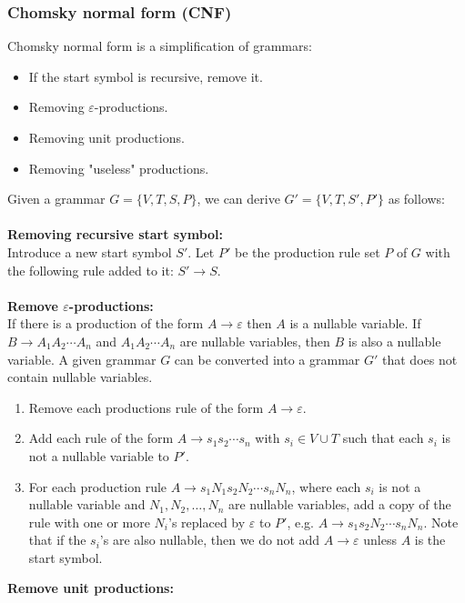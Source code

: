 \documentclass[11pt]{article}
\begin{document}
\subsubsection{Chomsky normal form (CNF)}
Chomsky normal form is a simplification of grammars:
\begin{itemize}
    \item If the start symbol is recursive, remove it.
    \item Removing $\varepsilon$-productions.
    \item Removing unit productions.
    \item Removing "useless" productions.
\end{itemize}
\begin{note_special}
Given a grammar $G=\{V,T,S,P\}$, we can derive $G'=\{V,T,S',P'\}$ as follows:
\\\\
\textbf{Removing recursive start symbol:}\\
Introduce a new start symbol $S'$. Let $P'$ be the production rule set $P$ of $G$ with the following rule added to it: $S'\rightarrow S$. 
\\\\
\textbf{Remove $\varepsilon$-productions:}\\
If there is a production of the form $A\rightarrow\varepsilon$ then $A$ is a nullable variable.
If $B\rightarrow A_1A_2\cdots A_n$ and $A_1A_2\cdots A_n$ are nullable variables, then $B$ is also a nullable variable.
A given grammar $G$ can be converted into a grammar $G'$ that does not contain nullable variables.
\begin{enumerate}
    \item Remove each productions rule of the form $A\rightarrow\varepsilon$.
    \item Add each rule of the form $A\rightarrow s_1s_2\cdots s_n$ with $s_i\in V\cup T$ such that each $s_i$ is not a nullable variable to $P'$.
    \item For each production rule $A\rightarrow s_1N_1s_2N_2\cdots s_nN_n$, where each $s_i$ is not a nullable variable and $N_1,N_2,\dots,N_n$ are nullable variables, add a copy of the rule with one or more $N_i$'s replaced by $\varepsilon$ to $P'$, e.g. $A\rightarrow s_1s_2N_2\cdots s_nN_n$.
    Note that if the $s_i$'s are also nullable, then we do not add $A\rightarrow\varepsilon$ unless $A$ is the start symbol.
\end{enumerate}
\textbf{Remove unit productions:}
\begin{itemize}

\end{itemize}
\end{note_special}
\end{document}

